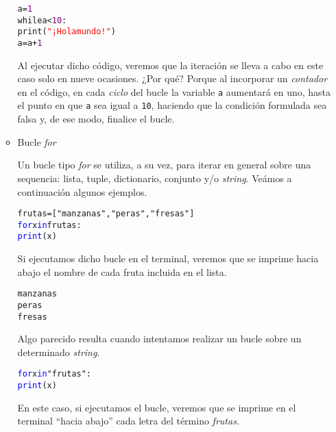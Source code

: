 \documentclass{article}
\begin{document}
\begin{enumerate}
\begin{itemize}
\begin{tcolorbox}
\begin{alltt}
a = \textcolor{purple}{1}
while a < \textcolor{purple}{10}:
    print(\textcolor{red}{"¡Hola mundo!"})
    a = a + \textcolor{purple}{1}
\end{alltt}        
\end{tcolorbox}
\par \hspace{0.5cm} Al ejecutar dicho código, veremos que la iteración se lleva a cabo en este caso solo en nueve ocasiones. ¿Por qué? Porque al incorporar un \emph{contador} en el código, en cada \emph{ciclo} del bucle la variable \verb|a| aumentará en uno, hasta el punto en que \verb|a| sea igual a \verb|10|, haciendo que la condición formulada sea falsa y, de ese modo, finalice el bucle.
\item Bucle \emph{for}
\par \hspace{5pt} Un bucle tipo \emph{for} se utiliza, a su vez, para iterar en general sobre una sequencia: lista, tuple, dictionario, conjunto y/o \emph{string}. Veámos a continuación algunos ejemplos.
\begin{tcolorbox}
\begin{alltt}
frutas = ["manzanas", "peras", "fresas"]
\textcolor{blue}{for} x \textcolor{blue}{in} frutas:
    \textcolor{blue}{print}(x)
\end{alltt}        
\end{tcolorbox}
\par \hspace{5pt} Si ejecutamos dicho bucle en el terminal, veremos que se imprime hacia abajo el nombre de cada fruta incluida en el lista.
\begin{tcolorbox}
\begin{alltt}
manzanas
peras
fresas
\end{alltt}        
\end{tcolorbox}
\vspace{0.5cm}
\par \hspace{5pt} Algo parecido resulta cuando intentamos realizar un bucle sobre un determinado \emph{string}.
\begin{tcolorbox}
\begin{alltt}
\textcolor{blue}{for} x \textcolor{blue}{in} "frutas":
    \textcolor{blue}{print}(x)
\end{alltt}        
\end{tcolorbox}
\par \hspace{5pt} En este caso, si ejecutamos el bucle, veremos que se imprime en el terminal ``hacia abajo'' cada letra del término \emph{frutas}.

\end{itemize}
\end{enumerate}
\end{document}
